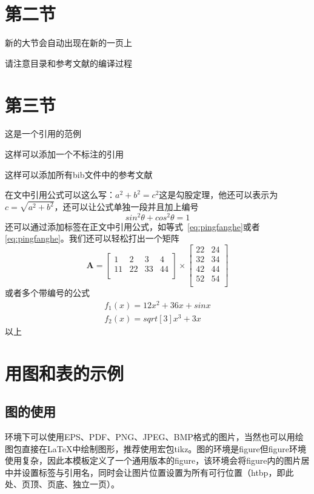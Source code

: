 \documentclass{HustGraduPaper}
\begin{document}
	\section{第二节}
	新的大节会自动出现在新的一页上
	
	请注意目录和参考文献的编译过程
	\section{第三节}
	这是一个引用的范例\cite{Stone_1998}
	
	这样可以添加一个不标注的引用\nocite{9787508342894}
	
	这样可以添加所有bib文件中的参考文献\nocite{*}
	
	在文中引用公式可以这么写：$a^2+b^2=c^2$这是勾股定理，他还可以表示为$c=\sqrt{a^2+b^2}$，还可以让公式单独一段并且加上编号
	\begin{equation}
	sin^2{\theta}+cos^2{\theta}=1 \label{eq:pingfanghe}
	\end{equation}
	还可以通过添加标签在正文中引用公式，如等式~\eqref{eq:pingfanghe}或者\autoref{eq:pingfanghe}。我们还可以轻松打出一个矩阵
	\begin{equation}
	\bm{A}=\begin{bmatrix}
	1&2&3&4\\
	11&22&33&44\\
	\end{bmatrix}
	\times\begin{bmatrix}
	22&24\\
	32&34\\
	42&44\\
	52&54\\
	\end{bmatrix}
	\end{equation}
	或者多个带编号的公式
	\begin{eqnarray}
	f_1(x)=12x^2+36x+sinx\\
	f_2(x)=sqrt[3]{x^3+3x}
	\end{eqnarray}
	以上
	
	\section{用图和表的示例}
	\subsection{图的使用}
	\XeLaTeX 环境下可以使用EPS、PDF、PNG、JPEG、BMP格式的图片，当然也可以用绘图包直接在\LaTeX 中绘制图形，推荐使用宏包tikz。图的环境是figure但figure环境使用复杂，因此本模板定义了一个通用版本的figure，该环境会将figure内的图片居中并设置标签与引用名，同时会让图片位置设置为所有可行位置（htbp，即此处、页顶、页底、独立一页）。
	
\end{document}
